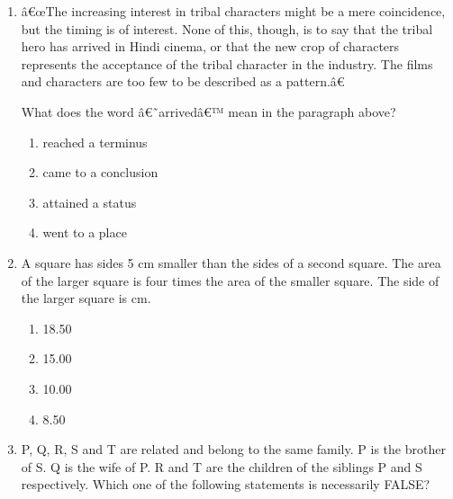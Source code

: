 \documentclass[12pt]{article}
\begin{document}
\begin{enumerate}[start=6,label=Q.\arabic*]
		\begin{multicols}{4}
			\begin{enumerate}[label=(\Alph*)]
				\item 23.30
				\item 25.00
				\item 28.00
				\item 50.00
			\end{enumerate}
		\end{multicols}

	\item â€œThe increasing interest in tribal characters might be a mere coincidence, but the timing is of interest. None of this, though, is to say that the tribal hero has arrived in Hindi cinema, or that the new crop of characters represents the acceptance of the tribal character in the industry. The films and characters are too few to be described as a pattern.â€

		What does the word â€˜arrivedâ€™ mean in the paragraph above?

		\begin{enumerate}[label=(\Alph*)]
			\item reached a terminus
			\item came to a conclusion
			\item attained a status
			\item went to a place
		\end{enumerate}

	\item A square has sides 5 cm smaller than the sides of a second square. The area of the larger square is four times the area of the smaller square. The side of the larger square is \underline{\hspace{1cm}} cm.

		\begin{multicols}{4}
			\begin{enumerate}[label=(\Alph*)]
				\item 18.50
				\item 15.00
				\item 10.00
				\item 8.50
			\end{enumerate}
		\end{multicols}
	\item P, Q, R, S and T are related and belong to the same family. P is the brother of S. Q is the wife of P. R and T are the children of the siblings P and S respectively. Which one of the following statements is necessarily FALSE?


\end{enumerate}
\end{document}
